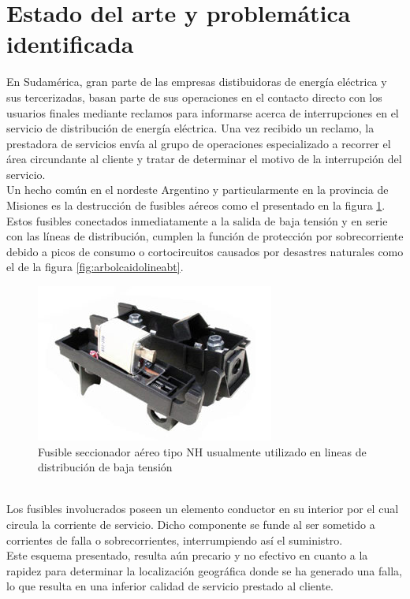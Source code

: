 \section{Estado del arte y problemática identificada}
En Sudamérica, gran parte de las empresas distibuidoras de energía eléctrica y sus tercerizadas, basan parte de sus operaciones en el contacto directo con los usuarios finales mediante reclamos para informarse acerca de interrupciones en el servicio de distribución de energía eléctrica. Una vez recibido un reclamo, la prestadora de servicios envía al grupo de operaciones especializado a recorrer el área circundante al cliente y tratar de determinar el motivo de la interrupción del servicio.\\
Un hecho común en el nordeste Argentino y particularmente en la provincia de Misiones es la destrucción de fusibles aéreos como el presentado en la figura \ref{fig:nh_aereo_bt}. Estos fusibles conectados inmediatamente a la salida de baja tensión y en serie con las líneas de distribución, cumplen la función de protección por sobrecorriente debido a picos de consumo o cortocircuitos causados por desastres naturales como el de la figura \ref{fig:arbolcaidolineabt}.\\
\begin{figure}[h!]
	\centering
	\includegraphics[width=0.7\linewidth]{Figures/NH_aereo_bt}
	\caption{Fusible seccionador aéreo tipo NH usualmente utilizado en lineas de distribución de baja tensión}
	\label{fig:nh_aereo_bt}
\end{figure}\\
Los fusibles involucrados poseen un elemento conductor en su interior por el cual circula la corriente de servicio. Dicho componente se funde al ser sometido a corrientes de falla o sobrecorrientes, interrumpiendo así el suministro.\\
Este esquema presentado, resulta aún precario y no efectivo en cuanto a la rapidez para determinar la localización geográfica donde se ha generado una falla, lo que resulta en una inferior calidad de servicio prestado al cliente.\\
